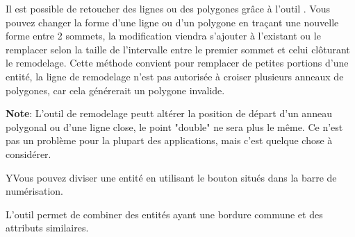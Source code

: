 \begin{itemize}
Il est possible de retoucher des lignes ou des polygones grâce à l'outil . Vous pouvez changer la forme d'une ligne ou d'un polygone en traçant une nouvelle forme entre 2 sommets, la modification viendra s'ajouter à l'existant ou le remplacer selon la taille de l'intervalle entre le premier sommet et celui clôturant le remodelage. Cette méthode convient pour remplacer de petites portions d'une entité, la ligne de remodelage n'est pas autorisée à croiser plusieurs anneaux de polygones, car cela générerait un polygone invalide.

\textbf{Note}: L'outil de remodelage peutt altérer la position de départ d'un anneau polygonal ou d'une ligne close, le point "double" ne sera plus le même. Ce n'est pas un problème pour la plupart des applications, mais c'est quelque chose à considérer.


YVous pouvez diviser une entité en utilisant le bouton  situés dans la barre de numérisation.


L'outil  permet de combiner des entités ayant une bordure commune et des attributs similaires.


\end{itemize}
